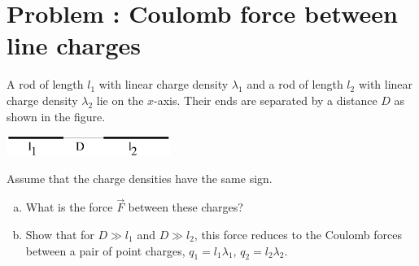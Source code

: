 \documentclass[problems]{esg8022pset}
\begin{document}
\section{Problem \thesection: Coulomb force between line charges}
  A rod of length $l_1$ with linear charge density $\lambda_1$ and a rod of length $l_2$ with linear charge density $\lambda_2$ lie on the $x$-axis.  Their ends are separated by a distance $D$ as shown in the figure.
  \begin{center}\includegraphics[width=0.4\textwidth]{ps01_9}\end{center}
  Assume that the charge densities have the same sign.
  \begin{enumerate}[(a)]
    \item What is the force $\vec F$ between these charges?
    \item Show that for $D \gg l_1$ and $D \gg l_2$, this force reduces to the Coulomb forces between a pair of point charges, $q_1 = l_1\lambda_1$, $q_2 = l_2\lambda_2$.
  \end{enumerate}
\end{document}
